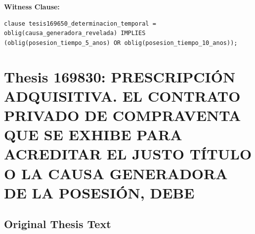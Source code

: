 \documentclass[11pt,a4paper]{article}
\begin{document}
\textbf{Witness Clause:}

\begin{lstlisting}[style=witnessstyle, language=Witness]
clause tesis169650_determinacion_temporal = oblig(causa_generadora_revelada) IMPLIES (oblig(posesion_tiempo_5_anos) OR oblig(posesion_tiempo_10_anos));
\end{lstlisting}

\newpage

\section{Thesis 169830: PRESCRIPCIÓN ADQUISITIVA. EL CONTRATO PRIVADO DE COMPRAVENTA QUE SE EXHIBE PARA ACREDITAR EL JUSTO TÍTULO O LA CAUSA GENERADORA DE LA POSESIÓN, DEBE}
\label{thesis:169830}

\subsection{Original Thesis Text}
\end{document}
